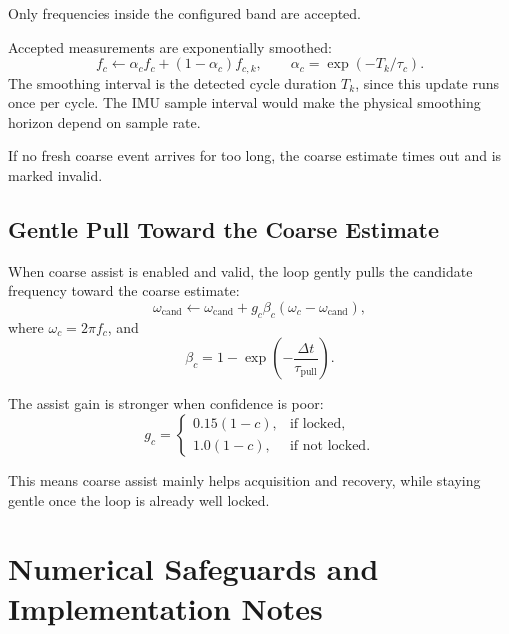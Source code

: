 \documentclass[conference]{IEEEtran}
\begin{document}
    Only frequencies inside the configured band are accepted.

    Accepted measurements are exponentially smoothed:
    \begin{equation}
        f_c \leftarrow \alpha_c f_c + (1-\alpha_c) f_{c,k},
        \qquad \alpha_c = \exp(-T_k/\tau_c).
    \end{equation}
    The smoothing interval is the detected cycle duration \(T_k\), since this
    update runs once per cycle. The IMU sample interval would make the physical
    smoothing horizon depend on sample rate.

    If no fresh coarse event arrives for too long, the coarse estimate times out
    and is marked invalid.

    \subsection{Gentle Pull Toward the Coarse Estimate}

    When coarse assist is enabled and valid, the loop gently pulls the candidate
    frequency toward the coarse estimate:
    \begin{equation}
        \omega_{\mathrm{cand}}
        \leftarrow
        \omega_{\mathrm{cand}}
        +
        g_c \beta_c(\omega_c - \omega_{\mathrm{cand}}),
    \end{equation}
    where \(\omega_c = 2\pi f_c\), and
    \begin{equation}
        \beta_c = 1 - \exp\!\left(-\frac{\Delta t}{\tau_{\mathrm{pull}}}\right).
    \end{equation}

    The assist gain is stronger when confidence is poor:
    \begin{equation}
        g_c =
        \begin{cases}
            0.15(1-c), & \text{if locked},\\[4pt]
            1.0(1-c), & \text{if not locked}.
        \end{cases}
    \end{equation}

    This means coarse assist mainly helps acquisition and recovery, while staying
    gentle once the loop is already well locked.

    \section{Numerical Safeguards and Implementation Notes}
\end{document}
